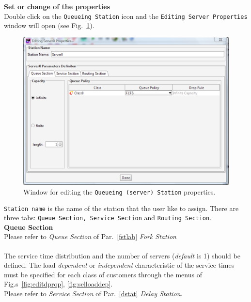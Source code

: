 \noindent \textbf{Set or change of the properties}\\
Double click on the \texttt{Queueing Station} icon and the
\texttt{Editing Server
Properties} window will open (see Fig.~\ref{fig:questatset}).\\
\begin{figure}[htb]
    \begin{center}
        \includegraphics[scale=.5]{img/jsimg/8.30.eps}
    \end{center}
    \caption{Window for editing the \texttt{Queueing (server) Station} properties.}
    \label{fig:questatset}
\end{figure}
\texttt{Station name} is the name of the station that the user
like to assign. There are three tabs: \texttt{Queue Section,
Service Section} and \texttt{Routing Section}.\\

\noindent \textbf{Queue Section}\\
Please refer to \emph{Queue Section} of Par.~\ref{fstlab} \emph{Fork Station}\\


\\
The service time
distribution and the number of servers (\emph{default} is 1)
should be defined. The load \emph{dependent} or \emph{independent}
characteristic of the service times must be specified for each
class of customers through the menus of Fig.s~\ref{fig:editdprop},
\ref{fig:selloaddep}.\\
Please refer to \emph{Service Section} of Par.~\ref{dstat} \emph{Delay Station}.\\



